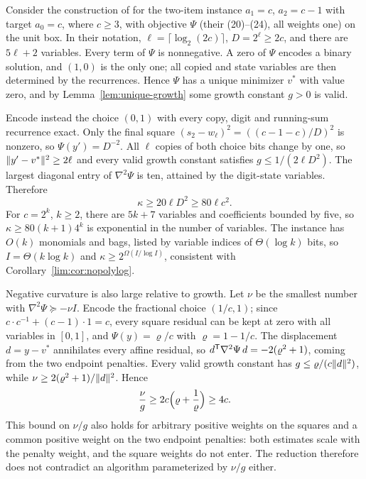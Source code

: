 \begin{remark}
\label{lim:rem:dk}
Consider the construction of \cite[Theorem~3]{DelPiaKhajavirad2026} for the
two-item instance $a_1=c$, $a_2=c-1$ with target $a_0=c$, where $c\ge3$, with
objective $\Psi$ (their (20)--(24), all weights one) on the unit box. In
their notation, $\ell=\lceil\log_2(2c)\rceil$, $D=2^\ell\ge2c$, and there are
$5\ell+2$ variables. Every term of $\Psi$ is nonnegative. A zero of $\Psi$
encodes a binary solution, and $(1,0)$ is the only one; all copied and state
variables are then determined by the recurrences. Hence $\Psi$ has a unique
minimizer $v^*$ with value zero, and by Lemma~\ref{lem:unique-growth} some
growth constant $g>0$ is valid.

Encode instead the choice $(0,1)$ with every copy, digit and running-sum
recurrence exact. Only the final square
$(s_2-w_\ell)^2=((c-1-c)/D)^2$ is nonzero, so $\Psi(y')=D^{-2}$. All
$\ell$ copies of both choice bits change by one, so
$\lVert y'-v^*\rVert^2\ge2\ell$ and every valid growth constant satisfies
$g\le1/(2\ell D^2)$. The largest diagonal entry of $\nabla^2\Psi$ is ten,
attained by the digit-state variables. Therefore
\[
\kappa\ge20\ell D^2\ge80\ell c^2 .
\]
For $c=2^k$, $k\ge2$, there are $5k+7$ variables and coefficients bounded
by five, so $\kappa\ge80(k+1)4^k$ is exponential in the number of variables.
The instance has $O(k)$ monomials and bags, listed by variable indices of
$\Theta(\log k)$ bits, so $I=\Theta(k\log k)$ and
$\kappa\ge2^{\Omega(I/\log I)}$, consistent with
Corollary~\ref{lim:cor:nopolylog}.

Negative curvature is also large relative to growth. Let $\nu$ be the
smallest number with $\nabla^2\Psi\succeq-\nu I$. Encode the fractional
choice $(1/c,1)$; since $c\cdot c^{-1}+(c-1)\cdot1=c$, every square residual
can be kept at zero with all variables in $[0,1]$, and $\Psi(y)=\varrho/c$
with $\varrho=1-1/c$. The displacement $d=y-v^*$ annihilates every affine
residual, so $d^{\mathsf T}\nabla^2\Psi\,d=-2(\varrho^2+1)$, coming from the two
endpoint penalties. Every valid growth constant has
$g\le\varrho/(c\lVert d\rVert^2)$, while $\nu\ge2(\varrho^2+1)/\lVert d\rVert^2$. Hence
\[
\frac\nu g\ge2c\Bigl(\varrho+\frac1\varrho\Bigr)\ge4c .
\]
This bound on $\nu/g$ also holds for arbitrary positive weights on the
squares and a common positive weight on the two endpoint penalties: both
estimates scale with the penalty weight, and the square weights do not
enter. The reduction therefore does not contradict an algorithm
parameterized by $\nu/g$ either.
\end{remark}


